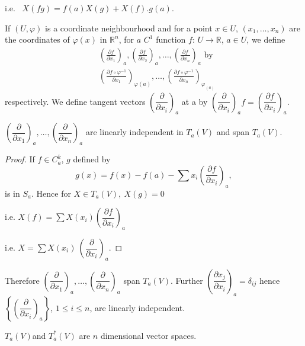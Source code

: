 i.e.~ $X(fg) = f(a) X(g) + X(f). g(a)$.

\begin{defi*} %
  If $(U, \varphi)$ is a coordinate neighbourhood and for a point $x
  \in U$, $(x_1, \ldots , x_n)$ are the coordinates of $\varphi (x)$
  in $\mathbb{R}^n$, for $a$ $C^1$ function $f$: $U \to \mathbb{R}$,
  $a \in U$, we define 
  \begin{align*}
    & \left(\frac{\partial f}{\partial x_1}\right)_a , \left(\frac{\partial
      f}{\partial x_2}\right)_a , \ldots , \left(\frac{\partial f}{\partial
      x_n}\right)_a \text { by }\\ 
    & \left(\frac{\partial f \circ \varphi^{-1}}{\partial
      x_1}\right)_{\varphi (a)} , 
    \ldots , \left(\frac{\partial f \circ \varphi^{-1}}{\partial
      x_n}\right)_{\varphi_{(a)}}   
  \end{align*}
  respectively. We define tangent vectors $\left(\dfrac{\partial}{\partial
    x_i}\right)_a$ at a by $\left(\dfrac{\partial}{\partial x_i}\right)_a f =
  \left(\dfrac{\partial f}{\partial x_i}\right)_a$. 
\end{defi*}

\begin{proposition}\label{chap2:sec1:prop2} %
  $\left(\dfrac{\partial}{\partial x_1}\right)_a, \ldots ,
  \left(\dfrac{\partial}{\partial x_n}\right)_a$ are linearly
  independent in $T_a (V)$ and span $T_a (V)$. 
\end{proposition}

\begin{proof}
  If $f \in C^k_a$, $g$ defined by
  $$
  g(x) = f(x) - f (a) - \sum x_i \left(\dfrac{\partial f}{\partial x_i
  }\right)_a, 
  $$
  is in $S_a$. Hence for $X \in T_a (V), ~ X(g) = 0$

  i.e. \qquad \quad $X(f) = \sum X(x_i) \left(\dfrac{\partial
    f}{\partial x_i}\right )_a$

  i.e. \quad \qquad $X = \sum X(x_i) ~ \left(\dfrac{\partial}{\partial
    x_i}\right )_a$.
\end{proof}

Therefore $\left(\dfrac{\partial}{\partial x_1}\right)_a , \ldots ,
\left(\dfrac{\partial}{\partial x_n}\right)_a$ span $T_a (V)$. Further
$\left(\dfrac{\partial x_j}{\partial x_i }\right)_a = \delta_{ij}$ hence
$\left\{\left(\dfrac{\partial}{\partial x_i }\right)_a\right\}$, $1
\le i \le n$, are linearly independent. 

\begin{coro*} %
$T_a (V)$\pageoriginale and $T^*_a(V)$ are $n$ dimensional vector spaces.
\end{coro*}


